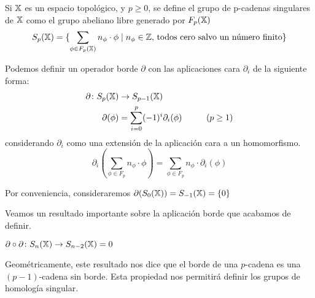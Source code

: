 \begin{definition}
  Si ${\mathbb X}$ es un espacio topológico, y $p \geq 0$, se define el grupo de p-cadenas singulares de ${\mathbb X}$
  como el grupo abeliano libre generado por $F_{p}({\mathbb X})$
  \[ S_p({\mathbb X}) = \{\sum_{\phi \in F_{p}({\mathbb X})} n_\phi \cdot \phi  \mid n_\phi \in \mathbb{Z} \text{, todos cero salvo un número finito} \}\]

  Podemos definir un operador borde $\partial$ con las aplicaciones cara $\partial_i$ de la siguiente forma:
  \begin{align*}
    \partial \colon S_p({\mathbb X}) &\to S_{p-1}({\mathbb X})\\
    \partial(\phi) &= \sum_{i = 0}^p (-1)^i \partial_i(\phi)  \hspace{1cm} (p \geq 1)
  \end{align*}
  considerando $\partial_i$ como una extensión de la aplicación cara a un homomorfismo.
  \[\partial_i(\sum_{\phi \in F_p} n_\phi \cdot \phi) = \sum_{\phi \in F_p} n_\phi \cdot \partial_i(\phi) \]
\end{definition}

Por conveniencia, consideraremos $\partial(S_0({\mathbb X})) = S_{-1}({\mathbb X}) = \{0\}$


Veamos un resultado importante sobre la aplicación borde que acabamos de definir.

\begin{proposition}
  $\partial \circ \partial \colon S_{n}({\mathbb X}) \to S_{n-2}({\mathbb X}) = 0$
\end{proposition}

Geométricamente, este resultado nos dice que el borde de una $p$-cadena es una $(p-1)$-cadena sin
borde. Esta propiedad nos permitirá definir los grupos de homología singular.

